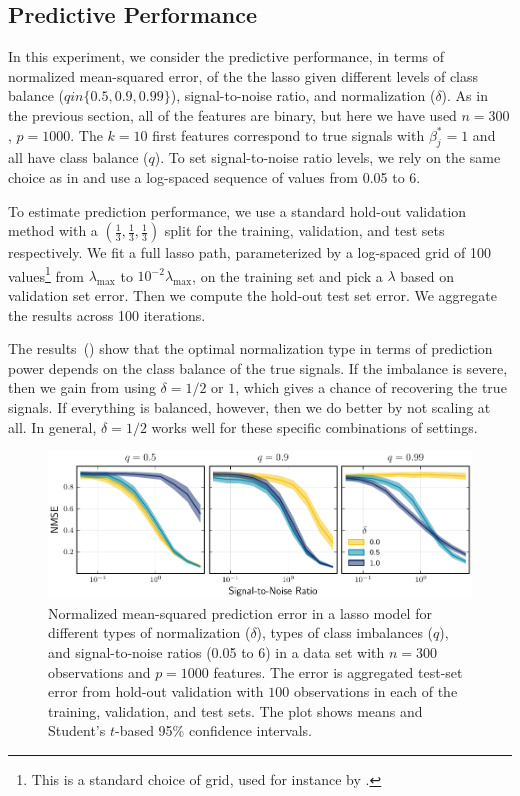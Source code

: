 \subsection{Predictive Performance}\label{sec:predictive-performance}

In this experiment, we consider the predictive performance, in terms of normalized mean-squared error, of the the lasso given different levels of class balance (\(q in \{0.5, 0.9, 0.99\}\)), signal-to-noise ratio, and normalization (\(\delta\)). As in the previous section, all of the features are binary, but here we have used \(n=300\), \(p = \num{1000}\). The \(k=10\) first features correspond to true signals with \(\beta^*_j = 1\) and all have class balance (\(q\)). To set signal-to-noise ratio levels, we rely on the same choice as in \citet{hastie2020} and use a log-spaced sequence of values from 0.05 to 6.

To estimate prediction performance, we use a standard hold-out validation method with a \((\frac{1}{3}, \frac{1}{3}, \frac{1}{3})\) split for the training, validation, and test sets respectively. We fit a full lasso path, parameterized by a log-spaced grid of 100 values\footnote{This is a standard choice of grid, used for instance by \citet{friedman2010}.} from \(\lambda_\text{max}\) to \(10^{-2}\lambda_\text{max}\), on the training set and pick a \(\lambda\) based on validation set error. Then we compute the hold-out test set error. We aggregate the results across 100 iterations.

The results~() show that the optimal normalization type in terms of prediction power depends on the class balance of the true signals. If the imbalance is severe, then we gain from using \(\delta=1/2\) or \(1\), which gives a chance of recovering the true signals. If everything is balanced, however, then we do better by not scaling at all. In general, \(\delta=1/2\) works well for these specific combinations of settings.

\begin{figure}[htpb]
  \centering
  \includegraphics[]{plots/binary_data_sim.pdf}
  \caption{%
    Normalized mean-squared prediction error in a lasso model for different types of normalization (\(\delta\)), types of class imbalances (\(q\)), and signal-to-noise ratios (0.05 to 6) in a data set with \(n=300\) observations and \(p = \num{1000}\) features. The error is aggregated test-set error from hold-out validation with \(100\) observations in each of the training, validation, and test sets. The plot shows means and Student's \(t\)-based 95\% confidence intervals.
  }
  \label{fig:binary-sim}
\end{figure}

